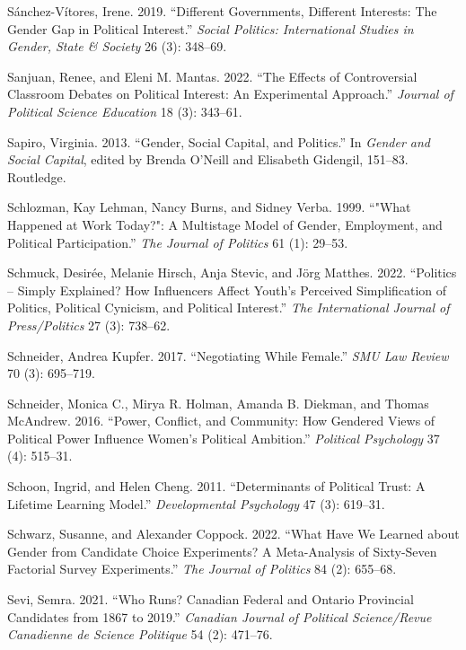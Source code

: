 \documentclass[
  letterpaper,
  DIV=11,
  numbers=noendperiod]{scrreprt}
\newlength{\cslhangindent}
\newenvironment{CSLReferences}[2] %
 {\begin{list}{}{%
  \setlength{\itemindent}{0pt}
  \setlength{\leftmargin}{0pt}
  \setlength{\parsep}{0pt}
  \ifodd #1
   \setlength{\leftmargin}{\cslhangindent}
   \setlength{\itemindent}{-1\cslhangindent}
  \fi
  \setlength{\itemsep}{#2\baselineskip}}}
 {\end{list}}
\begin{document}
\begin{CSLReferences}{1}{0}
Sánchez-Vítores, Irene. 2019. {``{Different Governments, Different
Interests: The Gender Gap in Political Interest}.''} \emph{{Social
Politics: International Studies in Gender, State \& Society}} 26 (3):
348--69.

Sanjuan, Renee, and Eleni M. Mantas. 2022. {``{The Effects of
Controversial Classroom Debates on Political Interest: An Experimental
Approach}.''} \emph{Journal of Political Science Education} 18 (3):
343--61.

Sapiro, Virginia. 2013. {``{Gender, Social Capital, and Politics}.''} In
\emph{{Gender and Social Capital}}, edited by Brenda O'Neill and
Elisabeth Gidengil, 151--83. Routledge.

Schlozman, Kay Lehman, Nancy Burns, and Sidney Verba. 1999. {``{"What
Happened at Work Today?": A Multistage Model of Gender, Employment, and
Political Participation}.''} \emph{The Journal of Politics} 61 (1):
29--53.

Schmuck, Desirée, Melanie Hirsch, Anja Stevic, and Jörg Matthes. 2022.
{``{Politics -- Simply Explained? How Influencers Affect Youth's
Perceived Simplification of Politics, Political Cynicism, and Political
Interest}.''} \emph{The International Journal of Press/Politics} 27 (3):
738--62.

Schneider, Andrea Kupfer. 2017. {``{Negotiating While Female}.''}
\emph{SMU Law Review} 70 (3): 695--719.

Schneider, Monica C., Mirya R. Holman, Amanda B. Diekman, and Thomas
McAndrew. 2016. {``{Power, Conflict, and Community: How Gendered Views
of Political Power Influence Women's Political Ambition}.''}
\emph{Political Psychology} 37 (4): 515--31.

Schoon, Ingrid, and Helen Cheng. 2011. {``{Determinants of Political
Trust: A Lifetime Learning Model}.''} \emph{Developmental Psychology} 47
(3): 619--31.

Schwarz, Susanne, and Alexander Coppock. 2022. {``{What Have We Learned
about Gender from Candidate Choice Experiments? A Meta-Analysis of
Sixty-Seven Factorial Survey Experiments}.''} \emph{The Journal of
Politics} 84 (2): 655--68.

Sevi, Semra. 2021. {``{Who Runs? Canadian Federal and Ontario Provincial
Candidates from 1867 to 2019}.''} \emph{Canadian Journal of Political
Science/Revue Canadienne de Science Politique} 54 (2): 471--76.


\end{CSLReferences}
\end{document}
